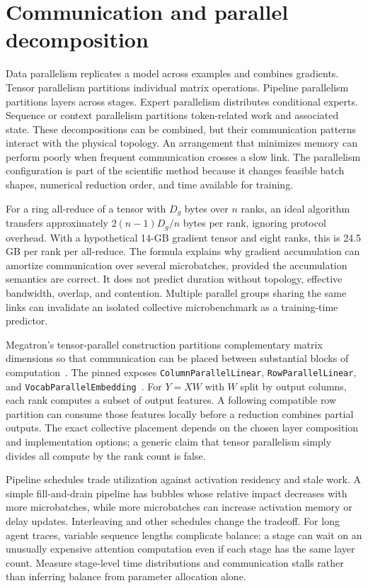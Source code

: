 \section{Communication and parallel decomposition}
\label{sec:C07:parallelism}
Data parallelism replicates a model across examples and combines gradients. Tensor parallelism partitions individual matrix operations. Pipeline parallelism partitions layers across stages. Expert parallelism distributes conditional experts. Sequence or context parallelism partitions token-related work and associated state. These decompositions can be combined, but their communication patterns interact with the physical topology. An arrangement that minimizes memory can perform poorly when frequent communication crosses a slow link. The parallelism configuration is part of the scientific method because it changes feasible batch shapes, numerical reduction order, and time available for training.

For a ring all-reduce of a tensor with $D_g$ bytes over $n$ ranks, an ideal algorithm transfers approximately $2(n-1)D_g/n$ bytes per rank, ignoring protocol overhead. With a hypothetical 14-GB gradient tensor and eight ranks, this is 24.5 GB per rank per all-reduce. The formula explains why gradient accumulation can amortize communication over several microbatches, provided the accumulation semantics are correct. It does not predict duration without topology, effective bandwidth, overlap, and contention. Multiple parallel groups sharing the same links can invalidate an isolated collective microbenchmark as a training-time predictor.

Megatron's tensor-parallel construction partitions complementary matrix dimensions so that communication can be placed between substantial blocks of computation~\cite{shoeybi2019megatron}. The pinned  exposes \texttt{ColumnParallelLinear}, \texttt{RowParallelLinear}, and \texttt{VocabParallelEmbedding}~\cite{repo_megatron}. For $Y=XW$ with $W$ split by output columns, each rank computes a subset of output features. A following compatible row partition can consume those features locally before a reduction combines partial outputs. The exact collective placement depends on the chosen layer composition and implementation options; a generic claim that tensor parallelism simply divides all compute by the rank count is false.

Pipeline schedules trade utilization against activation residency and stale work. A simple fill-and-drain pipeline has bubbles whose relative impact decreases with more microbatches, while more microbatches can increase activation memory or delay updates. Interleaving and other schedules change the tradeoff. For long agent traces, variable sequence lengths complicate balance: a stage can wait on an unusually expensive attention computation even if each stage has the same layer count. Measure stage-level time distributions and communication stalls rather than inferring balance from parameter allocation alone.

